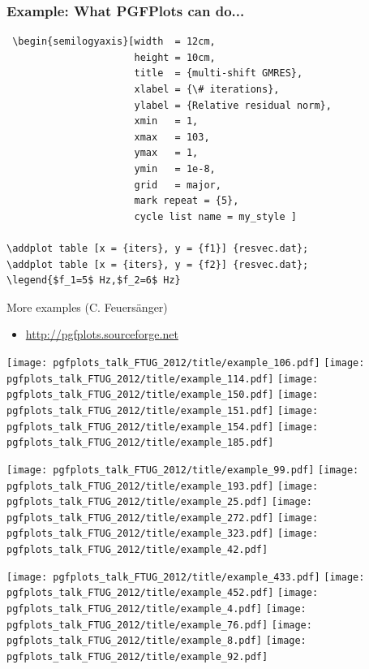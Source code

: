\documentclass{beamer}
\begin{document}
\begin{frame}[fragile]
\frametitle{Example: What PGFPlots can do...}
\begin{verbatim}
 \begin{semilogyaxis}[width  = 12cm, 
                      height = 10cm,
                      title  = {multi-shift GMRES},
                      xlabel = {\# iterations},
                      ylabel = {Relative residual norm},
                      xmin   = 1,
                      xmax   = 103,
                      ymax   = 1,
                      ymin   = 1e-8,
                      grid   = major,
                      mark repeat = {5},
                      cycle list name = my_style ] 
                     
\addplot table [x = {iters}, y = {f1}] {resvec.dat};
\addplot table [x = {iters}, y = {f2}] {resvec.dat};
\legend{$f_1=5$ Hz,$f_2=6$ Hz} 
\end{verbatim}
\end{frame}

\begin{frame}{More examples (C. Feuers\"anger)}
    \begin{itemize}
        \item \url{http://pgfplots.sourceforge.net}
     \end{itemize}
 \texttt{[image: pgfplots\_talk\_FTUG\_2012/title/example\_106.pdf]} 
 \texttt{[image: pgfplots\_talk\_FTUG\_2012/title/example\_114.pdf]} 
 \texttt{[image: pgfplots\_talk\_FTUG\_2012/title/example\_150.pdf]} 
 \texttt{[image: pgfplots\_talk\_FTUG\_2012/title/example\_151.pdf]} 
 \texttt{[image: pgfplots\_talk\_FTUG\_2012/title/example\_154.pdf]} 
 \texttt{[image: pgfplots\_talk\_FTUG\_2012/title/example\_185.pdf]}

 \texttt{[image: pgfplots\_talk\_FTUG\_2012/title/example\_99.pdf]}
 \texttt{[image: pgfplots\_talk\_FTUG\_2012/title/example\_193.pdf]} 
 \texttt{[image: pgfplots\_talk\_FTUG\_2012/title/example\_25.pdf]} 
 \texttt{[image: pgfplots\_talk\_FTUG\_2012/title/example\_272.pdf]} 
 \texttt{[image: pgfplots\_talk\_FTUG\_2012/title/example\_323.pdf]} 
 \texttt{[image: pgfplots\_talk\_FTUG\_2012/title/example\_42.pdf]} 

 \texttt{[image: pgfplots\_talk\_FTUG\_2012/title/example\_433.pdf]} 
 \texttt{[image: pgfplots\_talk\_FTUG\_2012/title/example\_452.pdf]} 
 \texttt{[image: pgfplots\_talk\_FTUG\_2012/title/example\_4.pdf]} 
 \texttt{[image: pgfplots\_talk\_FTUG\_2012/title/example\_76.pdf]} 
 \texttt{[image: pgfplots\_talk\_FTUG\_2012/title/example\_8.pdf]} 
 \texttt{[image: pgfplots\_talk\_FTUG\_2012/title/example\_92.pdf]} 
\end{frame}
\end{document}
